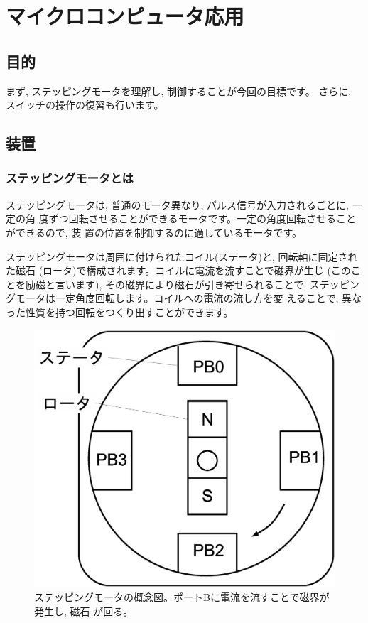 \chapter{マイクロコンピュータ応用}

\section{目的}

まず, ステッピングモータを理解し, 制御することが今回の目標です。
さらに, スイッチの操作の復習も行います。

\section{装置}

\subsection{ステッピングモータとは}

ステッピングモータは, 普通のモータ異なり, パルス信号が入力されるごとに, 一定の角
度ずつ回転させることができるモータです。一定の角度回転させることができるので, 装
置の位置を制御するのに適しているモータです。

ステッピングモータは周囲に付けられたコイル(ステータ)と, 回転軸に固定された磁石
(ロータ)で構成されます。コイルに電流を流すことで磁界が生じ
(このことを励磁と言います), その磁界により磁石が引き寄せられることで, ステッピン
グモータは一定角度回転します。コイルへの電流の流し方を変
えることで, 異なった性質を持つ回転をつくり出すことができます。


\begin{figure}[htbp]
\begin{center}
\includegraphics[width=0.5\linewidth]{img/steppingmotor.eps}
\caption{ステッピングモータの概念図。ポートBに電流を流すことで磁界が発生し, 磁石
    が回る。}
\label{fig:steppingmotor}
\end{center}
\end{figure}

